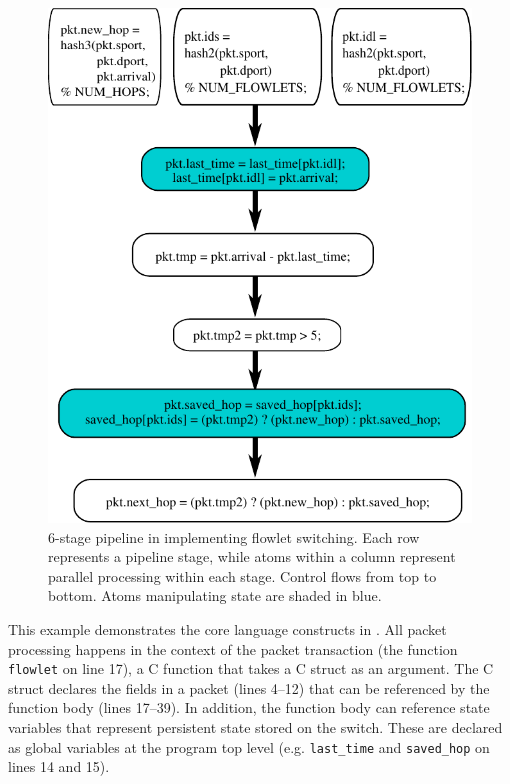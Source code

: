 \begin{figure}[!t]
  \includegraphics[width=\columnwidth]{pipe.pdf}
  \caption{6-stage pipeline in \absmachine implementing flowlet switching.
           Each row represents a pipeline stage, while atoms within a column
           represent parallel processing within each stage. Control flows from
           top to bottom. Atoms manipulating state are shaded in blue.}
  \label{fig:pipeline}
\end{figure}

This example demonstrates the core language constructs in \pktlanguage. All
packet processing happens in the context of the packet transaction (the
function \texttt{flowlet} on line 17), a C function that takes a C struct as an
argument. The C struct declares the fields in a packet (lines 4--12) that can
be referenced by the function body (lines 17--39).  In addition, the function
body can reference state variables that represent persistent state stored on
the switch. These are declared as global variables at the program top level
(e.g. \texttt{last\_time} and \texttt{saved\_hop} on lines 14 and 15).

